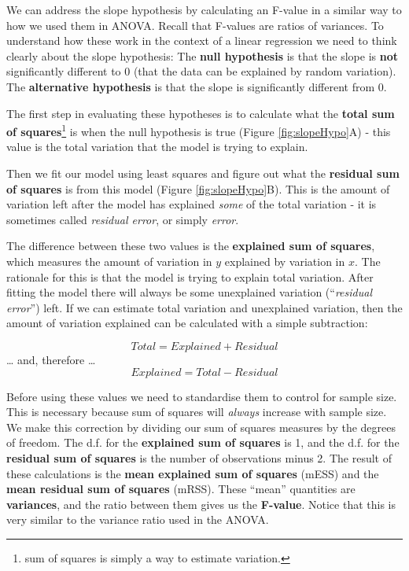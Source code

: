 \documentclass[
  a4paperpaper,
]{book}
\begin{document}
We can address the slope hypothesis by calculating an F-value in a similar way to how we used them in ANOVA. Recall that F-values are ratios of variances. To understand how these work in the context of a linear regression we need to think clearly about the slope hypothesis: The \textbf{null hypothesis} is that the slope is \textbf{not} significantly different to 0 (that the data can be explained by random variation). The \textbf{alternative hypothesis} is that the slope is significantly different from 0.

The first step in evaluating these hypotheses is to calculate what the \textbf{total sum of squares}\footnote{sum of squares is simply a way to estimate variation.} is when the null hypothesis is true (Figure \ref{fig:slopeHypo}A) - this value is the total variation that the model is trying to explain.

Then we fit our model using least squares and figure out what the \textbf{residual sum of squares} is from this model (Figure \ref{fig:slopeHypo}B). This is the amount of variation left after the model has explained \emph{some} of the total variation - it is sometimes called \emph{residual error}, or simply \emph{error}.

The difference between these two values is the \textbf{explained sum of squares}, which measures the amount of variation in \(y\) explained by variation in \(x\). The rationale for this is that the model is trying to explain total variation. After fitting the model there will always be some unexplained variation (``\emph{residual error}'') left. If we can estimate total variation and unexplained variation, then the amount of variation explained can be calculated with a simple subtraction:

\[Total = Explained + Residual\]
\ldots{} and, therefore \ldots{}
\[Explained = Total - Residual\]

Before using these values we need to standardise them to control for sample size. This is necessary because sum of squares will \emph{always} increase with sample size. We make this correction by dividing our sum of squares measures by the degrees of freedom. The d.f. for the \textbf{explained sum of squares} is 1, and the d.f. for the \textbf{residual sum of squares} is the number of observations minus 2. The result of these calculations is the \textbf{mean explained sum of squares} (mESS) and the \textbf{mean residual sum of squares} (mRSS). These ``mean'' quantities are \textbf{variances}, and the ratio between them gives us the \textbf{F-value}. Notice that this is very similar to the variance ratio used in the ANOVA.
\end{document}

